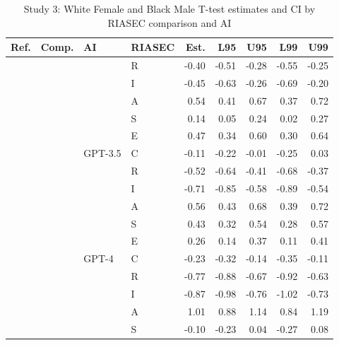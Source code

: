\begin{table}

\caption{Study 3: White Female and Black Male T-test estimates and CI by RIASEC comparison and AI}
\centering
\fontsize{8}{10}\selectfont
\begin{tabular}[t]{llllrrrrr}
\toprule
Ref. & Comp. & AI & RIASEC & Est. & L95 & U95 & L99 & U99\\
\midrule
 &  &  & R & -0.40 & -0.51 & -0.28 & -0.55 & -0.25\\

 &  &  & I & -0.45 & -0.63 & -0.26 & -0.69 & -0.20\\

 &  &  & A & 0.54 & 0.41 & 0.67 & 0.37 & 0.72\\

 &  &  & S & 0.14 & 0.05 & 0.24 & 0.02 & 0.27\\

 &  &  & E & 0.47 & 0.34 & 0.60 & 0.30 & 0.64\\

 &  & \multirow[t]{-6}{*}{\raggedright\arraybackslash GPT-3.5} & C & -0.11 & -0.22 & -0.01 & -0.25 & 0.03\\

 &  &  & R & -0.52 & -0.64 & -0.41 & -0.68 & -0.37\\

 &  &  & I & -0.71 & -0.85 & -0.58 & -0.89 & -0.54\\

 &  &  & A & 0.56 & 0.43 & 0.68 & 0.39 & 0.72\\

 &  &  & S & 0.43 & 0.32 & 0.54 & 0.28 & 0.57\\

 &  &  & E & 0.26 & 0.14 & 0.37 & 0.11 & 0.41\\

 &  & \multirow[t]{-6}{*}{\raggedright\arraybackslash GPT-4} & C & -0.23 & -0.32 & -0.14 & -0.35 & -0.11\\

 &  &  & R & -0.77 & -0.88 & -0.67 & -0.92 & -0.63\\

 &  &  & I & -0.87 & -0.98 & -0.76 & -1.02 & -0.73\\

 &  &  & A & 1.01 & 0.88 & 1.14 & 0.84 & 1.19\\

 &  &  & S & -0.10 & -0.23 & 0.04 & -0.27 & 0.08\\


\end{tabular}
\end{table}
